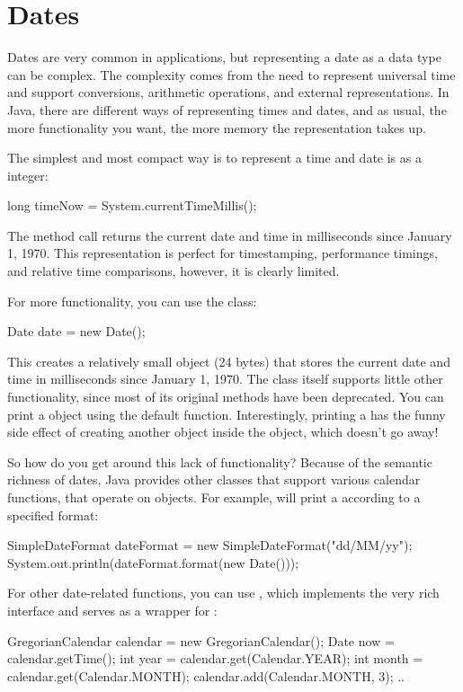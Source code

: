 \section{Dates}

Dates are very common in applications, but representing a date as a data type
can be complex. The complexity comes from the need to represent
universal time  and support conversions, arithmetic operations, and external
representations. In Java, there are different ways of representing times and
dates, and as usual, the more functionality you want, the more memory the
representation takes up.

The simplest and most compact way is to represent a time and date is as a
 integer:
\begin{shortlisting}
    long timeNow = System.currentTimeMillis();
\end{shortlisting}
The method call  returns the current 
date and time in milliseconds since January 1, 1970.  This representation is
perfect for timestamping, performance timings, and relative time
comparisons, however, it is clearly limited.  

For more functionality, you can use the  class:
\begin{shortlisting}
    Date date = new Date();
\end{shortlisting}
This creates a relatively small object (24 bytes) that stores the current date
and time in milliseconds since January 1, 1970. The class  itself
supports little other functionality, since most of its original methods have
been deprecated. You can print a  object using the default
 function. Interestingly, printing a  has the funny
side effect of creating another object inside the  object, which
doesn't go away!

So how do you get around this lack of functionality?
Because of the semantic richness of dates, Java provides other classes that
support various calendar functions, that operate on  objects. For
example,  will print a  according to a
specified format:
\begin{shortlisting}
    SimpleDateFormat dateFormat =  new SimpleDateFormat("dd/MM/yy"); 
    System.out.println(dateFormat.format(new Date())); 
\end{shortlisting}

For other date-related functions, you can use 
, which implements the very rich 
interface and serves as a wrapper for :
\begin{shortlisting}

	GregorianCalendar calendar = new GregorianCalendar();
    Date now = calendar.getTime();
    int year       = calendar.get(Calendar.YEAR);
	int month      = calendar.get(Calendar.MONTH); 
	calendar.add(Calendar.MONTH, 3); 
	..
    
\end{shortlisting}

